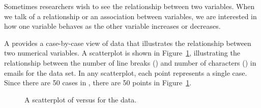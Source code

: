 \newcommand{\loanA}{10.90}
\newcommand{\loanB}{9.92}
\newcommand{\loanC}{26.30}
\newcommand{\loanD}{9.92}
\newcommand{\loanY}{9.43}
\newcommand{\loanZ}{6.08}
\newcommand{\loanAvg}{11.57}
\newcommand{\loanVar}{25.52}
\newcommand{\loanSD}{5.05}
\newcommand{\loanN}{50}
\newcommand{\loanMedianBelow}{9.93\%}
\newcommand{\loanMedianAbove}{9.93\%}
\newcommand{\loanMedian}{9.93\%}
\newcommand{\loanQA}{7.96}
\newcommand{\loanQC}{13.72}
\newcommand{\loanIQR}{5.76}
\newcommand{\loanAdev}{-0.67}
\newcommand{\loanBdev}{-1.65}
\newcommand{\loanCdev}{14.73}
\newcommand{\loanDdev}{-1.65}
\newcommand{\loanYdev}{-2.14}
\newcommand{\loanZdev}{-5.49}
\newcommand{\loanSmallestValue}{5.31}
\newcommand{\loanLargestValue}{26.30}


Sometimes researchers wish to see the relationship between two variables. When we talk of a relationship or an association between variables, we are interested in how one variable behaves as the other variable increases or decreases.

A  provides a case-by-case view of data that illustrates the relationship between two numerical variables. A scatterplot is shown in Figure~\ref{email50LinesCharacters}, illustrating the relationship between the number of line breaks () and number of characters () in emails for the  data set. In any scatterplot, each point represents a single case. Since there are 50 cases in , there are 50 points in Figure~\ref{email50LinesCharacters}.

\setlength{\captionwidth}{0.885\textwidth}

\begin{figure}[h]
   \centering
   \caption{A scatterplot of  versus  for the  data.}
   \label{email50LinesCharacters}
\end{figure}

\setlength{\captionwidth}{\mycaptionwidth}

